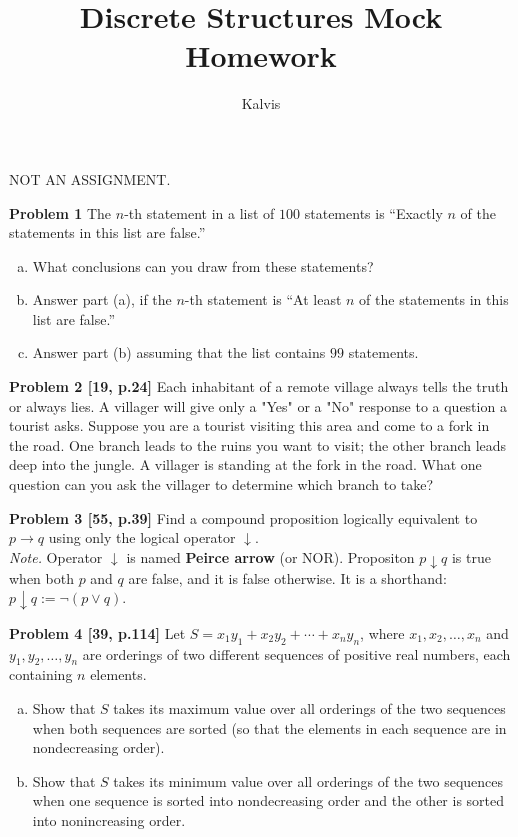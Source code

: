 \documentclass[jou]{apa6}
\title{Discrete Structures \textendash{} Mock Homework}
\author{Kalvis}
\affiliation{RBS}
\begin{document}
\maketitle
\noindent
NOT AN ASSIGNMENT.

\vspace{2ex}
{\bf Problem 1} The $n$-th statement in a list of $100$ statements is
``Exactly $n$ of the statements in this list are false.'' 
\begin{enumerate}[(a)]
\item What conclusions can you draw from these statements?
\item Answer part (a), if the $n$-th statement is ``At least $n$ of 
the statements in this list are false.''
\item Answer part (b) assuming that the list contains $99$ statements.
\end{enumerate}

\vspace{2ex}
{\bf Problem 2 [19, p.24]} Each inhabitant of a remote village always tells the 
truth or always lies. A villager will give only a "Yes" or a "No" response
to a question a tourist asks. Suppose you are a tourist visiting this area and come
to a fork in the road. One branch leads to the ruins you want to visit; the
other branch leads deep into the jungle. A villager is standing at the fork in the road. 
What one question can you ask the villager to determine which branch to take?

\vspace{2ex}
{\bf Problem 3 [55, p.39]} 
Find a compound proposition logically equivalent to $p \rightarrow q$ using 
only the logical operator $\downarrow$.\\
{\em Note.} Operator $\downarrow$ is named {\bf Peirce arrow} (or NOR). 
Propositon $p \downarrow q$ is true when both $p$ and $q$ are false, and it is 
false otherwise. It is a shorthand: $p \downarrow q := \neg(p \vee q)$. 

\vspace{2ex}
{\bf Problem 4 [39, p.114]} 
Let $S = x_1y_1 + x_2y_2 + \cdots + x_ny_n$, where $x_1,x_2,\ldots,x_n$
and $y_1,y_2,\ldots,y_n$ are orderings of two different sequences
of positive real numbers, each containing $n$ elements.
\begin{enumerate}[(a)]
\item Show that $S$ takes its maximum value over all orderings of the two 
sequences when both sequences are sorted (so that the elements in each 
sequence are in nondecreasing order). 
\item Show that $S$ takes its minimum value over all orderings of the two 
sequences when one sequence is sorted into nondecreasing order and the other 
is sorted into nonincreasing order.
\end{enumerate}
\end{document}
